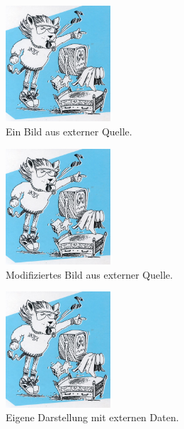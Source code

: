\begin{figure}[ht]
        \centering
            \includegraphics[width=0.35\textwidth]{img/latex.jpg}    %
            \caption[\LaTeX~Logo]
                {Ein Bild aus externer Quelle.}
            \label{fig:texlogo2}
\end{figure}

\begin{figure}[ht]
        \centering
            \includegraphics[width=0.35\textwidth]{img/latex.jpg}    %
            \caption[\LaTeX~Logo]
                {Modifiziertes Bild aus externer Quelle.}
            \label{fig:texlogo3}
\end{figure}

\begin{figure}[ht]
        \centering
            \includegraphics[width=0.35\textwidth]{img/latex.jpg}    %
            \caption[\LaTeX~Logo]
                {Eigene Darstellung mit externen Daten.}
            \label{fig:texlogo4}
\end{figure}


